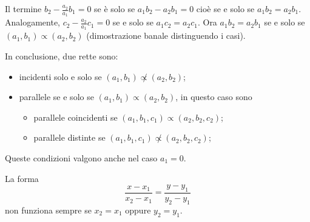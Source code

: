 \documentclass[a4paper]{article}
\begin{document}
Il termine \(b_2 - \frac{a_2}{a_1}b_1 = 0\) se è solo se \(a_1b_2 - a_2b_1 = 0\)
cioè se e solo se \(a_1b_2 = a_2b_1\).
Analogamente, \(c_2 - \frac{a_2}{a_1}c_1 = 0\) se e solo se \(a_1c_2 = a_2c_1\).
Ora \(a_1b_2 = a_2b_1\) se e solo se \((a_1,b_1) \propto (a_2, b_2)\) (dimostrazione banale distinguendo i casi).

In conclusione, due rette sono:
\begin{itemize}
    \item incidenti solo e solo se \((a_1, b_1) \not\propto (a_2, b_2)\);
    \item parallele se e solo se \((a_1, b_1) \propto (a_2, b_2)\),
        in questo caso sono
        \begin{itemize}
            \item parallele coincidenti se \((a_1, b_1, c_1) \propto (a_2, b_2, c_2)\);
            \item parallele distinte se \((a_1, b_1, c_1) \not\propto (a_2, b_2, c_2)\);
        \end{itemize}
\end{itemize}

Queste condizioni valgono anche nel caso \(a_1=0\).



La forma
\[
    \frac{x-x_1}{x_2-x_1} = \frac{y-y_1}{y_2-y_1}
\]
non funziona sempre se \(x_2=x_1\) oppure \(y_2=y_1\).


\pagebreak
\end{document}
